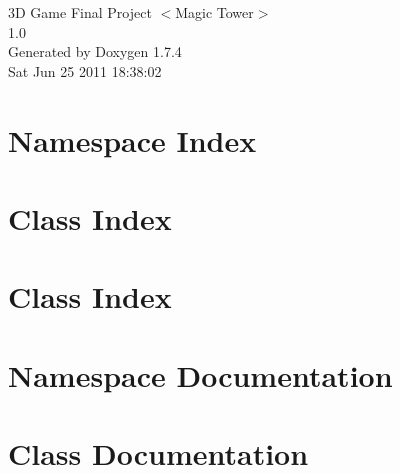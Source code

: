 \documentclass[a4paper]{book}
\begin{document}
\hypersetup{pageanchor=false}
\begin{titlepage}
\vspace*{7cm}
\begin{center}
{\Large 3D Game Final Project $<$Magic Tower$>$ \\[1ex]\large 1.0 }\\
\vspace*{1cm}
{\large Generated by Doxygen 1.7.4}\\
\vspace*{0.5cm}
{\small Sat Jun 25 2011 18:38:02}\\
\end{center}
\end{titlepage}
\clearemptydoublepage
{}
\tableofcontents
\clearemptydoublepage
{}
\hypersetup{pageanchor=true}
\chapter{Namespace Index}

\chapter{Class Index}

\chapter{Class Index}

\chapter{Namespace Documentation}

\chapter{Class Documentation}




































\printindex
\end{document}
